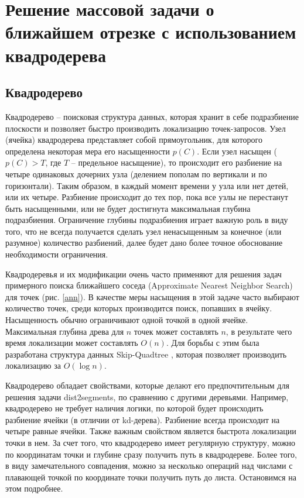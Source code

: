 \chapter{Решение массовой задачи о ближайшем отрезке с использованием квадродерева}
\section{Квадродерево}
Квадродерево -- поисковая структура данных, которая хранит в себе
подразбиение плоскости и позволяет быстро производить локализацию
точек-запросов. Узел (ячейка) квадродерева представляет собой прямоугольник, для
которого определена некоторая мера его насыщенности $p(C)$. Если узел
насыщен ($p(C) > T$, где $T$ -- предельное насыщение), то происходит его
разбиение на четыре одинаковых дочерних узла (делением пополам по
вертикали и по горизонтали). Таким образом, в каждый момент времени у узла
или нет детей, или их четыре. Разбиение происходит до тех пор, пока все узлы
не перестанут быть насыщенными, или не будет достигнута максимальная
глубина подразбиения. Ограничение глубины подразбиения играет важную
роль в виду того, что не всегда получается сделать узел ненасыщенным за
конечное (или разумное) количество разбиений, далее будет дано более 
точное обоснование необходимости ограничения.

Квадродеревья и их модификации очень часто применяют для решения
задач примерного поиска ближайшего соседа (Approximate Nearest Neighbor
Search) для точек \cite{FANN} (рис. \ref{ann}). В качестве меры насыщения в этой задаче часто
выбирают количество точек, среди которых производится поиск, попавших в
ячейку. Насыщенность обычно ограничивают одной точкой в одной ячейке.
Максимальная глубина древа для $n$ точек может составлять $n$, в результате чего
время локализации может составлять $O(n)$. Для борьбы с этим была разработана
структура данных Skip-Quadtree \cite{SQT}, которая позволяет производить локализацию за $O(\log n)$.


Квадродерево обладает свойствами, которые делают его предпочтительным
для решения задачи dist2segments, по сравнению с другими деревьями.
Например, квадродерево не требует наличия логики, по которой будет происходить
разбиение ячейки (в отличии от kd-дерева). Разбиение всегда происходит на четыре
равные ячейки. Также важным свойством является быстрота локализации точки в нем.
За счет того, что квадродерево имеет регулярную структуру, можно по координатам точки
и глубине сразу получить путь в квадродереве. Более того, в виду замечательного
совпадения, можно за несколько операций над числами с плавающей точкой по координате точки получить путь
до листа. Остановимся на этом подробнее.


